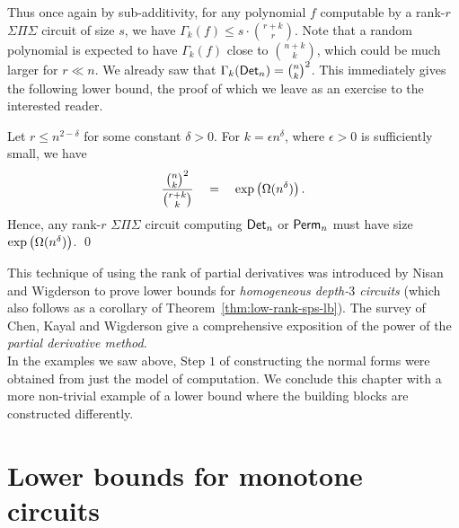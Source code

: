 Thus once again by sub-additivity, for any polynomial $f$ computable by a rank-$r$ $\Sigma\Pi\Sigma$ circuit of size $s$, we have $\Gamma_k(f) \leq s\cdot \binom{r+k}{r}$. Note that a random polynomial is expected to have $\Gamma_k(f)$ close to $\binom{n+k}{k}$, which could be much larger for $r\ll n$. We already saw that $\Gamma_k(\mathsf{Det}_n) = \binom{n}{k}^2$. This immediately gives the following lower bound, the proof of which we leave as an exercise to the interested reader. 

\begin{theorem}\label{thm:low-rank-sps-lb}
Let $r \leq n^{2-\delta}$ for some constant $\delta > 0$. For $k = \epsilon n^{\delta}$, where $\epsilon > 0$ is sufficiently small, we have
$$
\frac{\binom{n}{k}^2}{\binom{r+k}{k}} \quad=\quad \exp\left(\Omega(n^{\delta})\right).
$$
Hence, any rank-$r$ $\Sigma\Pi\Sigma$ circuit computing $\mathsf{Det}_n$ or $\mathsf{Perm}_n$ must have size $\exp\left(\Omega(n^\delta)\right)$. \qed
\end{theorem}


This technique of using the rank of partial derivatives was introduced by Nisan and Wigderson \cite{nw1997} to prove lower bounds for \emph{homogeneous depth-$3$ circuits} (which also follows as a corollary of Theorem~\ref{thm:low-rank-sps-lb}). The survey of Chen, Kayal and Wigderson \cite{ckw11} give a comprehensive exposition of the power of the \emph{partial derivative method}. \\

In the examples we saw above, Step $1$ of constructing the normal forms were obtained from just the model of computation. We conclude this chapter with a more non-trivial example of a lower bound where the building blocks are constructed differently. 

\section{Lower bounds for monotone circuits}


